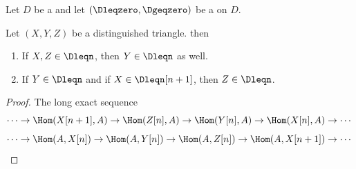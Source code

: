 \begin{lemma} \label{lemma:extension_of_objects_in_t_structures_for_triangulated_categories_are_in_t_structures}
            Let $D$ be a  and let $(\Dleqzero, \Dgeqzero)$ be a  on $D$.

Let $(X,Y,Z)$ be a distinguished triangle. then

\begin{enumerate}
    \item If $X,Z \in \Dleqn$, then $Y \in \Dleqn$ as well.
    \item If $Y \in \Dleqn$ and if $X \in \Dleqn[n+1]$, then $Z \in \Dleqn$. 
\end{enumerate}
\end{lemma}

\begin{proof}

    The long exact sequence 
    $$\cdots \to \Hom(X[n+1],A) \to \Hom(Z[n],A) \to \Hom(Y[n],A) \to \Hom(X[n],A) \to \cdots $$
    $$\cdots \to \Hom(A,X[n]) \to \Hom(A,Y[n]) \to \Hom(A,Z[n]) \to \Hom(A,X[n+1]) \to \cdots $$
\end{proof}
